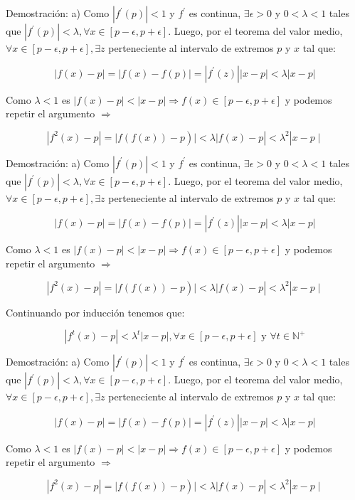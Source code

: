 \documentclass[11pt]{beamer}
\begin{document}
Demostración: a) Como $\left|f^{\prime}(p)\right|<1$ y $f^{\prime}$ es continua, $\exists \epsilon>0$ y $0<\lambda<1$ tales que $\left|f^{\prime}(p)\right|<\lambda, \forall x \in[p-\epsilon, p+\epsilon]$. Luego, por el teorema del valor medio, $\forall x \in[p-\epsilon, p+\epsilon], \exists z$ perteneciente al intervalo de extremos $p$ y $x$ tal que:

$$
|f(x)-p|=|f(x)-f(p)|=\left|f^{\prime}(z)\right||x-p|<\lambda|x-p|
$$

Como $\lambda<1$ es $|f(x)-p|<|x-p| \Longrightarrow f(x) \in[p-\epsilon, p+\epsilon]$ y podemos repetir el argumento $\Longrightarrow$

$$
\left.\left|f^{2}(x)-p\right|=\mid f(f(x))-p\right)|<\lambda| f(x)-p\left|<\lambda^{2}\right| x-p \mid
$$

Demostración: a) Como $\left|f^{\prime}(p)\right|<1$ y $f^{\prime}$ es continua, $\exists \epsilon>0$ y $0<\lambda<1$ tales que $\left|f^{\prime}(p)\right|<\lambda, \forall x \in[p-\epsilon, p+\epsilon]$. Luego, por el teorema del valor medio, $\forall x \in[p-\epsilon, p+\epsilon], \exists z$ perteneciente al intervalo de extremos $p$ y $x$ tal que:

$$
|f(x)-p|=|f(x)-f(p)|=\left|f^{\prime}(z)\right||x-p|<\lambda|x-p|
$$

Como $\lambda<1$ es $|f(x)-p|<|x-p| \Longrightarrow f(x) \in[p-\epsilon, p+\epsilon]$ y podemos repetir el argumento $\Longrightarrow$

$$
\left.\left|f^{2}(x)-p\right|=\mid f(f(x))-p\right)|<\lambda| f(x)-p\left|<\lambda^{2}\right| x-p \mid
$$

Continuando por inducción tenemos que:

$$
\left|f^{t}(x)-p\right|<\lambda^{t}|x-p|, \forall x \in[p-\epsilon, p+\epsilon] \text { y } \forall t \in \mathbb{N}^{+}
$$

Demostración: a) Como $\left|f^{\prime}(p)\right|<1$ y $f^{\prime}$ es continua, $\exists \epsilon>0$ y $0<\lambda<1$ tales que $\left|f^{\prime}(p)\right|<\lambda, \forall x \in[p-\epsilon, p+\epsilon]$. Luego, por el teorema del valor medio, $\forall x \in[p-\epsilon, p+\epsilon], \exists z$ perteneciente al intervalo de extremos $p$ y $x$ tal que:

$$
|f(x)-p|=|f(x)-f(p)|=\left|f^{\prime}(z)\right||x-p|<\lambda|x-p|
$$

Como $\lambda<1$ es $|f(x)-p|<|x-p| \Longrightarrow f(x) \in[p-\epsilon, p+\epsilon]$ y podemos repetir el argumento $\Longrightarrow$

$$
\left.\left|f^{2}(x)-p\right|=\mid f(f(x))-p\right)|<\lambda| f(x)-p\left|<\lambda^{2}\right| x-p \mid
$$
\end{document}
